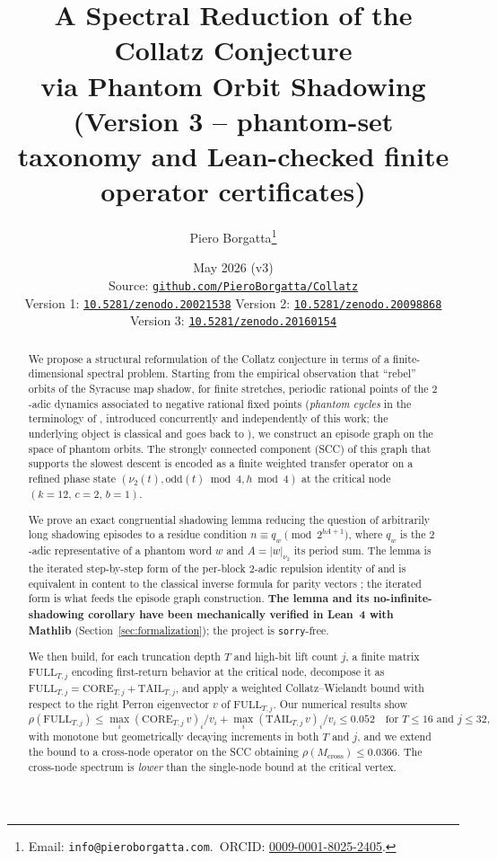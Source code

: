 \documentclass[11pt,a4paper]{article}
\title{
  A Spectral Reduction of the Collatz Conjecture \\
  via Phantom Orbit Shadowing
  \\[4pt]\large\normalfont (Version 3 -- phantom-set taxonomy and Lean-checked finite operator certificates)
}
\author{
  Piero Borgatta\thanks{Email: \texttt{info@pieroborgatta.com}.\
    ORCID: \href{https://orcid.org/0009-0001-8025-2405}{0009-0001-8025-2405}.}
}
\date{May 2026 (v3) \\[2pt]
  \small\normalfont
  Source: \href{https://github.com/PieroBorgatta/Collatz}{\texttt{github.com/PieroBorgatta/Collatz}}
  \\[2pt]
  \small\normalfont
  Version 1: \href{https://doi.org/10.5281/zenodo.20021538}{\texttt{10.5281/zenodo.20021538}} \quad
  Version 2: \href{https://doi.org/10.5281/zenodo.20098868}{\texttt{10.5281/zenodo.20098868}} \quad
  Version 3: \href{https://doi.org/10.5281/zenodo.20160154}{\texttt{10.5281/zenodo.20160154}}
}
\theoremstyle{definition}
\newcommand{\full}{\mathrm{FULL}}
\newcommand{\core}{\mathrm{CORE}}
\newcommand{\tail}{\mathrm{TAIL}}
\newcommand{\spec}{\rho}
\begin{document}
\maketitle

\begin{abstract}
We propose a structural reformulation of the Collatz conjecture in
terms of a finite-dimensional spectral problem. Starting from the
empirical observation that ``rebel'' orbits of the Syracuse map
shadow, for finite stretches, periodic rational points of the
$2$-adic dynamics associated to negative rational fixed points
(\emph{phantom cycles} in the terminology of \cite{chang2026},
introduced concurrently and independently of this work; the
underlying object is classical and goes back to
\cite{lagarias1985}), we construct an episode graph on the space of
phantom orbits. The strongly connected component (SCC) of this graph
that supports the slowest descent is encoded as a finite weighted
transfer operator on a refined phase state
$(\nu_2(t), \mathrm{odd}(t)\bmod 4, h\bmod 4)$ at the critical node
$(k=12,\, c=2,\, b=1)$.

We prove an exact congruential shadowing lemma reducing the question
of arbitrarily long shadowing episodes to a residue condition
$n\equiv q_w\pmod{2^{bA+1}}$, where $q_w$ is the $2$-adic
representative of a phantom word $w$ and $A=|w|_{\nu_2}$ its period
sum. The lemma is the iterated step-by-step form of the per-block
$2$-adic repulsion identity of \cite[Prop.~7.4]{chang2026} and is
equivalent in content to the classical inverse formula for parity
vectors \cite[Lemma~1]{rozier2025}; the iterated form is what feeds
the episode graph construction. \textbf{The lemma and its
no-infinite-shadowing corollary have been mechanically verified in
Lean~4 with Mathlib} (Section~\ref{sec:formalization}); the project
is \texttt{sorry}-free.

We then build, for each truncation depth $T$ and high-bit lift count
$j$, a finite matrix $\full_{T,j}$ encoding first-return behavior at
the critical node, decompose it as
$\full_{T,j} = \core_{T,j} + \tail_{T,j}$, and apply a weighted
Collatz--Wielandt bound \cite{lemmensnussbaum} with respect to the
right Perron eigenvector $v$ of $\full_{T,j}$. Our numerical results
show
\[
\spec(\full_{T,j})
\le
\max_i (\core_{T,j}\, v)_i / v_i + \max_i (\tail_{T,j}\, v)_i / v_i
\le 0.052
\quad
\text{for $T \le 16$ and $j \le 32$,}
\]
with monotone but geometrically decaying increments in both $T$ and
$j$, and we extend the bound to a cross-node operator on the SCC
obtaining $\spec(M_{\mathrm{cross}}) \le 0.0366$. The cross-node
spectrum is \emph{lower} than the single-node bound at the critical
vertex.


\end{abstract}
\end{document}
